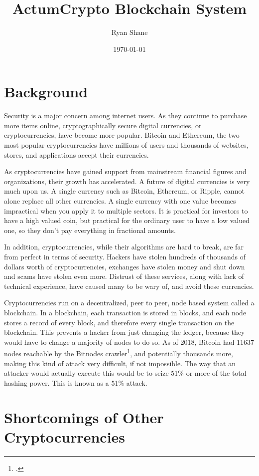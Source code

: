 \documentclass[letter]{article}
\title{ActumCrypto Blockchain System}
\author{Ryan Shane}
\affil{Creator/Developer, ActumCrypto}
\date{\today}
\begin{document}
\maketitle

\section{Background}
Security is a major concern among internet users. As they continue to purchase more items online, cryptographically secure digital currencies, or cryptocurrencies, have become more popular. Bitcoin and Ethereum, the two most popular cryptocurrencies have millions of users and thousands of websites, stores, and applications accept their currencies.

As cryptocurrencies have gained support from mainstream financial figures and organizations, their growth has accelerated. A future of digital currencies is very much upon us. A single currency such as Bitcoin, Ethereum, or Ripple, cannot alone replace all other currencies. A single currency with one value becomes impractical when you apply it to multiple sectors. It is practical for investors to have a high valued coin, but practical for the ordinary user to have a low valued one, so they don’t pay everything in fractional amounts.

In addition, cryptocurrencies, while their algorithms are hard to break, are far from perfect in terms of security. Hackers have stolen hundreds of thousands of dollars worth of cryptocurrencies, exchanges have stolen money and shut down and scams have stolen even more. Distrust of these services, along with lack of technical experience, have caused many to be wary of, and avoid these currencies.

Cryptocurrencies run on a decentralized, peer to peer, node based system called a blockchain. In a blockchain, each transaction is stored in blocks, and each node stores a record of every block, and therefore every single transaction on the blockchain. This prevents a hacker from just changing the ledger, because they would have to change a majority of nodes to do so. As of 2018, Bitcoin had 11637 nodes reachable by the Bitnodes crawler\footcite{bitnodes}, and potentially thousands more, making this kind of attack very difficult, if not impossible. The way that an attacker would actually execute this would be to seize 51\% or more of the total hashing power. This is known as a 51\% attack.

\section{Shortcomings of Other Cryptocurrencies}
\end{document}
